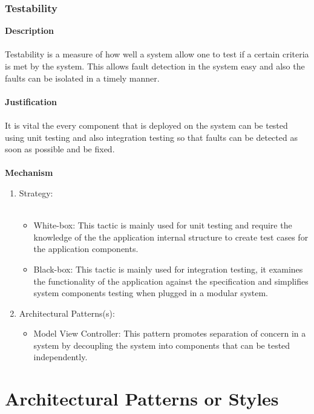 \documentclass[hidelinks, 12pt, oneside]{article}
\begin{document}
			\subsubsection{Testability}
			\textbf{Description}\\\\
			Testability is a measure of how well a system allow one to test if a certain criteria is met by the system. This allows fault detection in the system easy and also the faults can be isolated in a timely manner.\\\\
			\textbf{Justification}\\\\
			It is vital the every component that is deployed on the system can be tested using unit testing and also integration testing so that faults can be detected as soon as possible and be fixed. \\\\
			\textbf{Mechanism}
			\begin{enumerate}
				\item Strategy:\\\\
				\begin{itemize}
				\item White-box: This tactic is mainly used for unit testing and require the knowledge of the the application internal structure to create test cases for the application components.
				\item Black-box: This tactic is mainly used for integration testing, it examines the functionality of the application against the specification and simplifies system components testing when plugged in a modular system.
				\end{itemize}
				\item Architectural Patterns(s):
				\begin{itemize}
				\item Model View Controller: This pattern promotes separation of concern in a system by decoupling the system into components that can be tested independently.   
				\end{itemize}
			\end{enumerate}	
    \newpage
    \section{Architectural Patterns or Styles}
\end{document}
